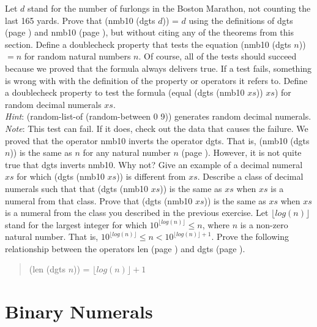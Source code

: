 \begin{ExerciseList}
\Exercise Let $d$ stand for the number of furlongs in
     the Boston Marathon, not counting the last 165 yards.
     Prove that (nmb10 (dgts $d$)) = $d$
     using the definitions of dgts (page \pageref{dgts-defun})
     and nmb10 (page \pageref{nmb10-defun}),
     but without citing any of the theorems from this section.
\Exercise Define a doublecheck property that tests
     the equation (nmb10 (dgts $n$)) $= n$ for random
     natural numbers $n$.
     Of course, all of the tests should succeed because
     we proved that the formula always delivers true.
     If a test fails, something is wrong with
     with the definition of the property or operators it refers to.
\Exercise Define a doublecheck property to test the formula
     (equal (dgts (nmb10 $xs$)) $xs$) for random
     decimal numerals $xs$.\\
     \emph{Hint}: (random-list-of (random-between 0 9))
     generates random decimal numerals.\\
     \emph{Note}: This test can fail.
     If it does, check out the data that causes the failure.
\Exercise We proved that the operator nmb10
     inverts the operator dgts.
     That is, (nmb10 (dgts $n$)) is the same as $n$
     for any natural number $n$ (page \pageref{dgts-ok}).
     However, it is not quite true that dgts inverts nmb10.
     Why not? Give an example of a decimal numeral
     $xs$ for which (dgts (nmb10 $xs$)) is different from $xs$.
\Exercise Describe a class of decimal numerals such that
     that (dgts (nmb10 $xs$)) is the same as $xs$
     when $xs$ is a numeral from that class.
\Exercise Prove that
    (dgts (nmb10 $xs$)) is the same as $xs$
     when $xs$ is a numeral from the class
     you described in the previous exercise.
\Exercise Let $\lfloor log(n) \rfloor$ stand for the
    largest integer for which $10^{\lfloor log(n) \rfloor} \leq n$,
    where $n$ is a non-zero natural number.
    That is, $10^{\lfloor log(n) \rfloor} \le n < 10^{\lfloor log(n) \rfloor + 1}$.
    Prove the following relationship between the operators
    len (page \pageref{len-equations}) and dgts (page \pageref{dgts-defun}).
\begin{quote}
    (len (dgts $n$)) = $\lfloor log(n) \rfloor + 1$
\end{quote}

\end{ExerciseList}

\section{Binary Numerals}
\label{sec:binary-numerals}

